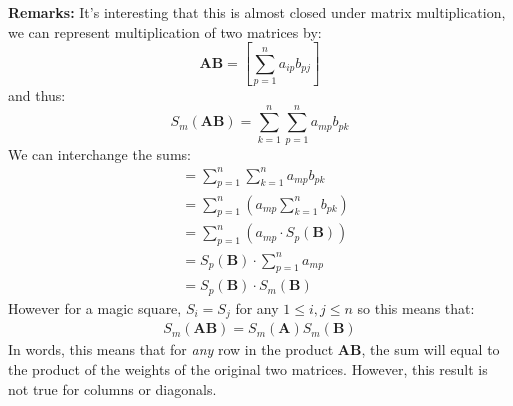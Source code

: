 \documentclass{article}
\begin{document}
\noindent \textbf{Remarks:} It's interesting that this is almost closed under matrix multiplication, we can represent multiplication of two matrices by:
\begin{equation}
    \bm{A}\bm{B} = \left[\sum_{p=1}^n a_{ip}b_{pj}\right] 
\end{equation}
and thus:
\begin{equation}
    S_m\left(\bm{A}\bm{B}\right) = \sum_{k=1}^n \sum_{p=1}^n a_{mp}b_{pk}
\end{equation}
We can interchange the sums:
\begin{align}
    &= \sum_{p=1}^n \sum_{k=1}^n a_{mp}b_{pk} \\ 
    &= \sum_{p=1}^n \left(a_{mp} \sum_{k=1}^n b_{pk}\right) \\ 
    &= \sum_{p=1}^n \left(a_{mp} \cdot S_p(\bm{B}) \right) \\ 
    &= S_p(\bm{B}) \cdot \sum_{p=1}^n a_{mp} \\ 
    &= S_p(\bm{B}) \cdot S_m(\bm{B})
\end{align}
However for a magic square, $S_i=S_j$ for any $1 \le i,j \le n$ so this means that:
\begin{align}
    S_m(\bm{A}\bm{B}) = S_m(\bm{A}) S_m(\bm{B})
\end{align}
In words, this means that for \textit{any} row in the product $\bm{A}\bm{B}$, the sum will equal to the product of the weights of the original two matrices. However, this result is not true for columns or diagonals.
\end{document}
